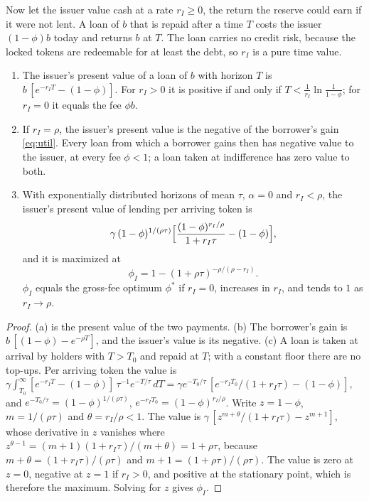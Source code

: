 Now let the issuer value cash at a rate $r_I\ge0$, the return the reserve could earn if it were not lent. A loan of $b$ that is repaid after a time $T$ costs the issuer $(1-\phi)b$ today and returns $b$ at $T$. The loan carries no credit risk, because the locked tokens are redeemable for at least the debt, so $r_I$ is a pure time value.

\begin{proposition}\label{prop:issuer}
\begin{enumerate}[label=(\alph*)]
\item The issuer's present value of a loan of $b$ with horizon $T$ is $b\,[e^{-r_IT}-(1-\phi)]$. For $r_I>0$ it is positive if and only if $T<\frac1{r_I}\ln\frac1{1-\phi}$; for $r_I=0$ it equals the fee $\phi b$.
\item If $r_I=\rho$, the issuer's present value is the negative of the borrower's gain \eqref{eq:util}. Every loan from which a borrower gains then has negative value to the issuer, at every fee $\phi<1$; a loan taken at indifference has zero value to both.
\item With exponentially distributed horizons of mean $\tau$, $\alpha=0$ and $r_I<\rho$, the issuer's present value of lending per arriving token is
\[
\gamma\,(1-\phi)^{1/(\rho\tau)}\Bigl[\frac{(1-\phi)^{r_I/\rho}}{1+r_I\tau}-(1-\phi)\Bigr],
\]
and it is maximized at
\[
\phi_I=1-(1+\rho\tau)^{-\rho/(\rho-r_I)} .
\]
$\phi_I$ equals the gross-fee optimum $\phi^\ast$ if $r_I=0$, increases in $r_I$, and tends to $1$ as $r_I\to\rho$.
\end{enumerate}
\end{proposition}
\begin{proof}
(a) is the present value of the two payments. (b) The borrower's gain is $b\,[(1-\phi)-e^{-\rho T}]$, and the issuer's value is its negative. (c) A loan is taken at arrival by holders with $T>T_0$ and repaid at $T$; with a constant floor there are no top-ups. Per arriving token the value is $\gamma\int_{T_0}^\infty[e^{-r_IT}-(1-\phi)]\,\tau^{-1}e^{-T/\tau}\,dT=\gamma e^{-T_0/\tau}\,[e^{-r_IT_0}/(1+r_I\tau)-(1-\phi)]$, and $e^{-T_0/\tau}=(1-\phi)^{1/(\rho\tau)}$, $e^{-r_IT_0}=(1-\phi)^{r_I/\rho}$. Write $z=1-\phi$, $m=1/(\rho\tau)$ and $\theta=r_I/\rho<1$. The value is $\gamma\,[z^{m+\theta}/(1+r_I\tau)-z^{m+1}]$, whose derivative in $z$ vanishes where $z^{\theta-1}=(m+1)(1+r_I\tau)/(m+\theta)=1+\rho\tau$, because $m+\theta=(1+r_I\tau)/(\rho\tau)$ and $m+1=(1+\rho\tau)/(\rho\tau)$. The value is zero at $z=0$, negative at $z=1$ if $r_I>0$, and positive at the stationary point, which is therefore the maximum. Solving for $z$ gives $\phi_I$.
\end{proof}

